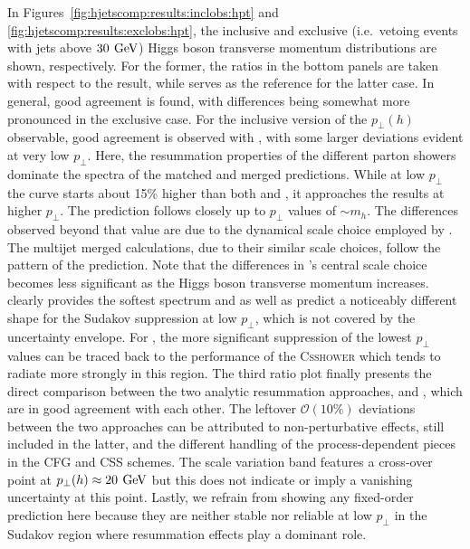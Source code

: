 In Figures~\ref{fig:hjetscomp:results:inclobs:hpt} and
\ref{fig:hjetscomp:results:exclobs:hpt}, the inclusive and exclusive
(i.e.~vetoing events with jets above $30\,\text{\:GeV}$) Higgs boson transverse momentum
distributions are shown, respectively.  For the former, the ratios in
the bottom panels are taken with respect to the \hjetscompHqT result, while
\hjetscompPowheg \hjetscompNNLOPS serves as the reference for the latter case. In
general, good agreement is found, with differences being somewhat more
pronounced in the exclusive case. For the inclusive version of the
$p_\perp(h)$ observable,  good agreement is observed with \hjetscompHqT,
with some larger deviations evident at very low $p_\perp$. Here, the
resummation properties of the different parton showers dominate the
spectra of the matched and merged predictions. While at low $p_\perp$
the \hjetscompSherpa \hjetscompNNLOPS curve starts about 15\% higher than both \hjetscompHqT and
\hjetscompPowheg \hjetscompNNLOPS, it approaches the \hjetscompHqT results at higher $p_\perp$.
The \hjetscompPowheg \hjetscompNNLOPS  prediction follows 
\hjetscompHqT closely up to $p_\perp$ values of $\sim m_h$. The differences 
observed beyond that value are due to the 
dynamical scale choice employed by \hjetscompPowheg \hjetscompNNLOPS. The multijet merged calculations, due to their
similar scale choices, follow the pattern of the \hjetscompPowheg \hjetscompNNLOPS
prediction. Note that the differences in \hjetscompMGaMC's central scale
choice becomes less significant as the Higgs boson transverse momentum
increases. \hjetscompHerwig clearly provides the softest spectrum and \hjetscompSherpa
as well as \hjetscompMGaMC predict a noticeably different shape for the Sudakov
suppression at low $p_\perp$, which is not covered by the \hjetscompHqT
uncertainty envelope. For \hjetscompSherpa, the more significant suppression of
the lowest $p_\perp$ values can be traced back to the performance of the
\textsc{Csshower} which tends to radiate more strongly in this region.
The third ratio plot finally presents the direct comparison between
the two analytic resummation approaches, \hjetscompHqT and \hjetscompResbos,
which are in good agreement with each other. The leftover
$\mathcal{O}(10\%)$ deviations between the two approaches can be
attributed to non-perturbative effects, still included in the latter, and the different handling of
the process-dependent pieces in the CFG and CSS schemes. The
\hjetscompResbos scale variation band features a cross-over point at
$p_\perp(h)\approx20\,\text{\:GeV}$ but this does not indicate or imply a
vanishing uncertainty at this point.
Lastly, we refrain from showing any fixed-order prediction here
because they are neither stable nor reliable at low $p_\perp$ in the
Sudakov region where resummation effects play a dominant role.

